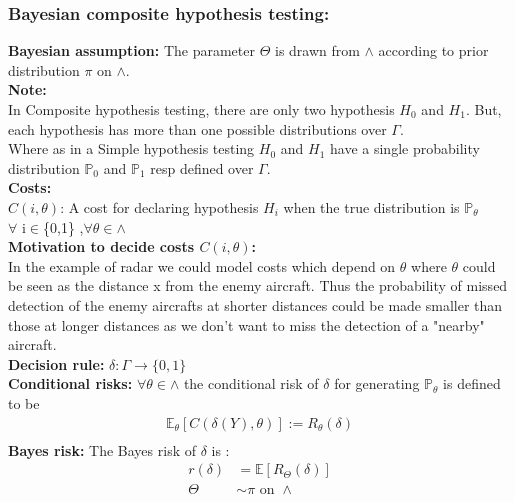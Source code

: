 \documentclass[12pt]{report}
\begin{document}
\subsubsection{Bayesian composite hypothesis testing:}
\textbf{Bayesian assumption:} The parameter $\Theta$ is drawn from $\wedge$ according to prior 
distribution $\pi$ on $\wedge$.\\[10pt]
{\bf Note:}\\
In Composite hypothesis testing, there are only two hypothesis  $H_0$ and $H_1$. But, each hypothesis has more than one possible distributions over $\Gamma$.\\
Where as in a Simple hypothesis testing $H_0$ and $H_1$ have a single probability distribution $\mathbb{P}_0$ and $\mathbb{P}_1$ resp defined over $\Gamma$.\\[10pt]
{\bf Costs:}\\ $C(i,\theta)$: A cost for declaring hypothesis $H_i$ when the true distribution is $\mathbb{P}_{\theta}$\\$\forall$ i$\in$\{0,1\} ,$\forall \theta\in\wedge$\\[10pt]
{\bf Motivation to decide costs $C(i,\theta)$:} \\
In the example of radar we could model costs which depend on $\theta$ where $\theta$ could be seen as the distance x from the enemy aircraft. Thus the probability of missed detection of the enemy aircrafts at shorter distances could be made smaller than those at longer distances as we don't want to miss the detection of a "nearby" aircraft. \\[10pt]
\textbf{Decision rule:} $\delta: \Gamma\rightarrow\{0,1\}$\\[10pt]
\textbf{Conditional risks:}
$\forall\theta\in\wedge$ the conditional risk of $\delta$ for generating $\mathbb{P}_{\theta}$ is defined to be
\begin{align*}
\mathbb{E}_{\theta}[C(\delta(Y),\theta)]:=R_\theta(\delta)\\
\end{align*}
\textbf{Bayes risk:} The Bayes risk of $\delta$ is :
\begin{align*}
r(\delta)&=\mathbb{E}[R_{\Theta}(\delta)]\\
\Theta&\sim\pi  \text{ on }  \wedge
\end{align*}
\end{document}
